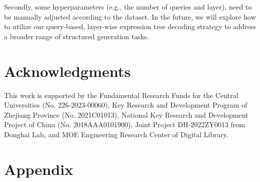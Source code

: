 \documentclass[11pt]{article}
\begin{document}
Secondly, some hyperparameters (e.g., the number of queries and layer), need to be manually adjusted according to the dataset. In the future, we will explore how to utilize our query-based, layer-wise expression tree decoding strategy to address a broader range of structured generation tasks.

\section*{Acknowledgments}
This work is supported by the Fundamental Research Funds for the Central Universities (No. 226-2023-00060), Key Research and Development Program of Zhejiang Province (No. 2021C01013), National Key Research and Development Project of China (No. 2018AAA0101900), Joint Project DH-2022ZY0013 from Donghai Lab, and MOE Engineering Research Center of Digital Library.














\appendix

\clearpage
\renewcommand\thefigure{\Alph{section}\arabic{figure}}    
\setcounter{figure}{0}    
\renewcommand\thetable{\Alph{section}\arabic{table}}    
\setcounter{table}{0}   
\section{Appendix}
\end{document}
